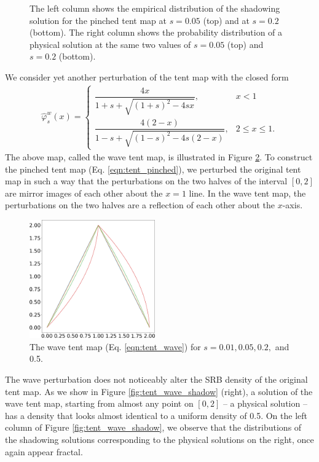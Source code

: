 \begin{figure}
    \caption{The left column shows the empirical distribution of the shadowing solution for the pinched tent map at $s=0.05$ (top) and at $s=0.2$ (bottom). The right column shows the probability distribution of a physical solution at the same two values of $s = 0.05$ (top) and $s = 0.2$ (bottom).}
    \label{fig:tent_pinched_shadow}
\end{figure}
We consider yet another perturbation of the tent map with the closed form
\begin{align}
\hat{\varphi}^w_s(x) = \begin{cases}
        \dfrac{4x}{1 + s + \sqrt{(1+s)^2 - 4s x} }, & x < 1 \\
        \dfrac{4(2-x)}{1 - s + \sqrt{(1-s)^2 - 4s(2- x)} }, & 2 \leq x \leq 1.
    \end{cases}
    \label{eqn:tent_wave}
\end{align}
The above map, called the wave tent map, is illustrated in Figure \ref{fig:tent_wave}.
To construct the pinched tent map (Eq. \ref{eqn:tent_pinched}), we perturbed the original tent map in such a way that the perturbations on the two halves of the interval $[0,2]$ are mirror images of each other about the $x=1$ line. In the wave tent map, the perturbations on the two halves are a reflection of each other about the 
$x$-axis.
\begin{figure}
    \centering
    \includegraphics[width=0.48\textwidth]{wave_tent_map.png}
    \caption{The wave tent map (Eq. \ref{eqn:tent_wave}) for $s = 0.01, 0.05, 0.2,$ and 0.5.}
    \label{fig:tent_wave}
\end{figure}
The wave perturbation does not noticeably alter the SRB density of the original tent map. As we show in Figure \ref{fig:tent_wave_shadow} (right), a solution of the 
wave tent map, starting from almost any point on $[0,2]$ -- a physical solution -- has a density that looks almost identical to a uniform density of 0.5. On the left column of Figure \ref{fig:tent_wave_shadow}, we observe that the distributions of the shadowing solutions corresponding to the physical solutions on the right, once again appear fractal.  
